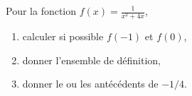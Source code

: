 
\begin{exercice}\label{exoPremiere-0018}

    Pour la fonction \( f(x)=\frac{\displaystyle 1}{\displaystyle x^2+4x }\),
    \begin{enumerate}
        \item
            calculer si possible \( f(-1)\) et \( f(0)\),
        \item
            donner l'ensemble de définition,
        \item
            donner le ou les antécédents de \( -1/4\).
    \end{enumerate}

\end{exercice}
